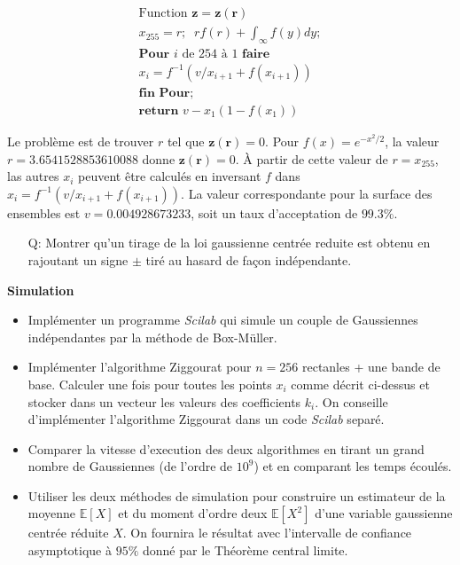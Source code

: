 \documentclass[a4paper]{article}
\begin{document}
\begin{align*}
\text{Function }\mathbf{z = z(r)}\\
x_{255} = r;\;\;rf(r)+\int_{\infty}f(y)dy;\\
\textbf{Pour }i \text{ de } 254 \text{ \`a } 1 \textbf{ faire}\\
x_i = f^{-1}(v/x_{i+1}+f(x_{i+1}))\\
\textbf{fin Pour;}\\
\textbf{return }v-x_1(1-f(x_1))
\end{align*}

Le probl\`eme est de trouver $r$ tel que $\mathbf{z(r)} = 0$. Pour $f(x) = e^{-x^2/2}$, la valeur $r=3.6541528853610088$ donne $\mathbf{z(r)} = 0$. \`A partir de cette valeur de $r = x_{255}$, las autres $x_i$ peuvent \^etre calcul\'es en inversant $f$ dans $x_i = f^{-1}(v/x_{i+1}+f(x_{i+1}))$. La valeur correspondante pour la surface des ensembles est $v = 0.004928673233$, soit un taux d'acceptation de $99.3\%$.
\begin{itemize}
\item[Q:] Montrer qu'un tirage de la loi gaussienne centr\'ee reduite est obtenu en rajoutant un signe $\pm$ tir\'e au hasard de fa\c{c}on ind\'ependante.
\end{itemize}

\textbf{Simulation}
\begin{itemize}
\item Impl\'ementer un programme \emph{Scilab} qui simule un couple de Gaussiennes ind\'ependantes par la m\'ethode de Box-M\"uller.
\item Impl\'ementer l'algorithme Ziggourat pour $n=256$ rectanles + une bande de base. Calculer une fois pour toutes les points $x_i$ comme d\'ecrit ci-dessus et stocker dans un vecteur les valeurs des coefficients $k_i$. On conseille d'impl\'ementer l'algorithme Ziggourat dans un code \emph{Scilab} separ\'e.
\item Comparer la vitesse d'execution des deux algorithmes en tirant un grand nombre de Gaussiennes (de l'ordre de $10^9$) et en comparant les temps \'ecoul\'es.
\item Utiliser les deux m\'ethodes de simulation pour construire un estimateur de la moyenne $\mathbb{E}[X]$ et du moment d'ordre deux $\mathbb{E}[X^2]$ d'une variable gaussienne centr\'ee r\'eduite $X$. On fournira le r\'esultat avec l'intervalle de confiance asymptotique \`a $95\%$ donn\'e par le Th\'eor\`eme central limite.
\end{itemize}
\end{document}
